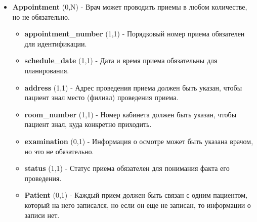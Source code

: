 \documentclass[a4paper, 14pt]{extarticle}
\begin{document}
\begin{itemize}
\begin{itemize}
\begin{itemize}
            \item \textbf{status} (1,1) - Статус рецепта обязателен для понимания его актуальности.
            \item \textbf{Patient} (1,1) - Каждый рецепт должен быть связан с пациентом, которому он выдан.
        \end{itemize}
        \item \textbf{Appointment} (0,N) - Врач может проводить приемы в любом количестве, но не обязательно.
        \begin{itemize}
            \item \textbf{appointment\_number} (1,1) - Порядковый номер приема обязателен для идентификации.
            \item \textbf{schedule\_date} (1,1) - Дата и время приема обязательны для планирования.
            \item \textbf{address} (1,1) - Адрес проведения приема должен быть указан, чтобы пациент знал место (филиал) проведения приема.
            \item \textbf{room\_number} (1,1) - Номер кабинета должен быть указан, чтобы пациент знал, куда конкретно приходить.
            \item \textbf{examination} (0,1) - Информация о осмотре может быть указана врачом, но это не обязательно.
            \item \textbf{status} (1,1) - Статус приема обязателен для понимания факта его проведения.
            \item \textbf{Patient} (0,1) - Каждый прием должен быть связан с одним пациентом, который на него записался, но если он еще не записан, то информации о записи нет.
        \end{itemize}
    \end{itemize}
    

\end{itemize}
\end{document}
